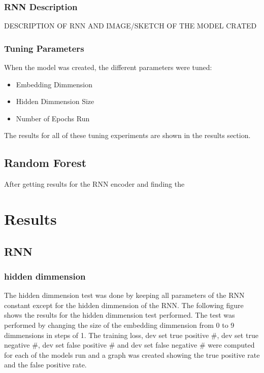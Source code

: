 \documentclass[twoside,twocolumn]{article}
\begin{document}
\subsubsection{RNN Description}

DESCRIPTION OF RNN AND IMAGE/SKETCH OF THE MODEL CRATED

\subsubsection{Tuning Parameters}

When the model was created, the different parameters were tuned:
\begin{itemize}
  \item{Embedding Dimmension}
  \item{Hidden Dimmension Size}
  \item{Number of Epochs Run}
\end{itemize}

The results for all of these tuning experiments are shown in the results section.


\subsection{Random Forest}

After getting results for the RNN encoder and finding the 


\section{Results}

\subsection{RNN}

\subsubsection{hidden dimmension}

The hidden dimmension test was done by keeping all parameters of the RNN constant except for the 
hidden dimmension of the RNN. The following figure shows the results for the hidden dimmension
test performed. The test was performed by changing the size of the embedding dimmension from 0 to 9
dimmensions in steps of 1. The training loss, dev set true positive #, dev set true negative #,
dev set false positive # and dev set false negative # were computed for each of the models run 
and a graph was created showing the true positive rate and the false positive rate.
\end{document}
